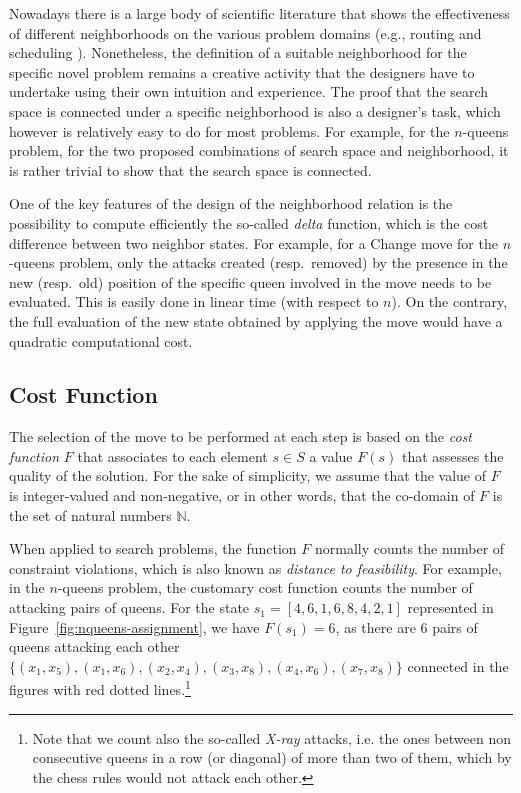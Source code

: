 Nowadays there is a large body of scientific literature that shows the
effectiveness of different neighborhoods on the various problem
domains (e.g., routing and scheduling \cite{IIKM05}).
Nonetheless, the definition of a suitable neighborhood for the
specific novel problem remains a creative activity that the designers
have to undertake using their own intuition and experience. The proof
that the search space is connected under a specific neighborhood is
also a designer's task, which however is relatively easy to do for
most problems. For example, for the $n$-queens problem, for the two
proposed combinations of search space and neighborhood, it is rather
trivial to show that the search space is connected.

One of the key features of the design of the neighborhood relation is
the possibility to compute efficiently the so-called \emph{delta}
function, which is the cost difference between two neighbor states.
For example, for a \textsf{Change} move for the $n$-queens problem,
only the attacks created (resp.\ removed) by the presence in the new
(resp.\ old) position of the specific queen involved in the move needs
to be evaluated. This is easily done in linear time (with respect to
$n$). On the contrary, the full evaluation of the new state obtained
by applying the move would have a quadratic computational cost.

\subsection{Cost Function}

The selection of the move to be performed at each step is based on the
\emph{cost function} $F$ that associates to each element $s\in S$ a
value $F(s)$ that assesses the quality of the solution. For the sake
of simplicity, we assume that the value of $F$ is integer-valued and
non-negative, or in other words, that the co-domain of $F$ is the set
of natural numbers $\mathbb{N}$.

When applied to search problems, the function $F$ normally counts the
number of constraint violations, which is also known as 
\emph{distance to feasibility}. For example, in the $n$-queens
problem, the customary cost function counts the number of attacking
pairs of queens. For the state $s_1 = [4,6,1,6,8,4,2,1]$ 
represented in Figure~\ref{fig:nqueens-assignment},
we have $F(s_1) = 6$, as there are 6 pairs of queens attacking each
other $\{(x_1,x_5), (x_1,x_6), (x_2,x_4), (x_3,x_8),  (x_4,x_6),  (x_7,x_8)\}$ 
connected in the figures with red dotted lines.\footnote{Note that we count also the so-called \emph{X-ray} attacks, i.e. the ones between non consecutive queens in a row (or diagonal) of more than two of them, which by the chess rules would not attack each other.}

